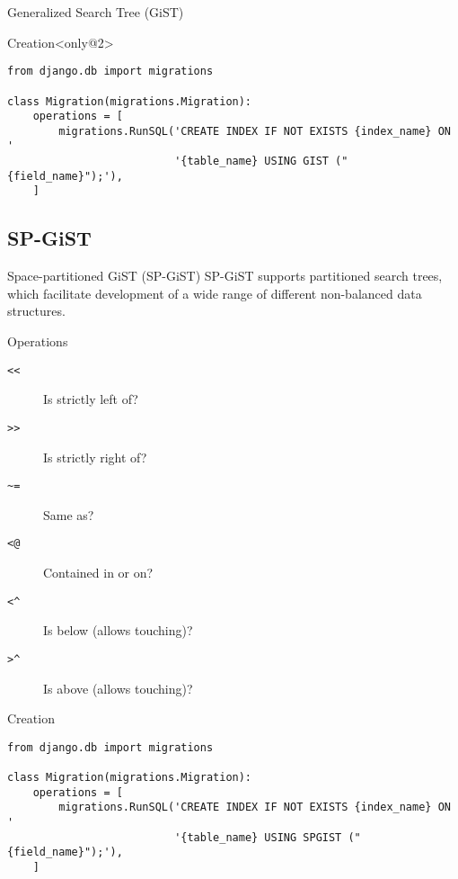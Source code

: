 \begin{frame}[fragile]{Generalized Search Tree (GiST)}
    \begin{block}{Creation}<only@2>
        \begin{verbatim}
from django.db import migrations

class Migration(migrations.Migration):
    operations = [
        migrations.RunSQL('CREATE INDEX IF NOT EXISTS {index_name} ON '
                          '{table_name} USING GIST ("{field_name}");'),
    ]
        \end{verbatim}
    \end{block}
\end{frame}

\subsection{SP-GiST}
\begin{frame}[fragile]{Space-partitioned GiST (SP-GiST)}
    SP-GiST supports partitioned search trees, which facilitate development of a wide range of different non-balanced data structures.
    
    \begin{block}{Operations}
        \begin{description}
            \item[\texttt{<}\texttt{<}] Is strictly left of?
            \item[\texttt{>}\texttt{>}] Is strictly right of?
            \item[\texttt{\textasciitilde}\texttt{=}] Same as?
            \item[\texttt{<}\texttt{@}] Contained in or on?
            \item[\texttt{<}\texttt{\textasciicircum}] Is below (allows touching)?
            \item[\texttt{>}\texttt{\textasciicircum}] Is above (allows touching)?
        \end{description}
    \end{block}

    \begin{block}{Creation}
        \begin{verbatim}
from django.db import migrations

class Migration(migrations.Migration):
    operations = [
        migrations.RunSQL('CREATE INDEX IF NOT EXISTS {index_name} ON '
                          '{table_name} USING SPGIST ("{field_name}");'),
    ]
        \end{verbatim}
    \end{block}
\end{frame}

